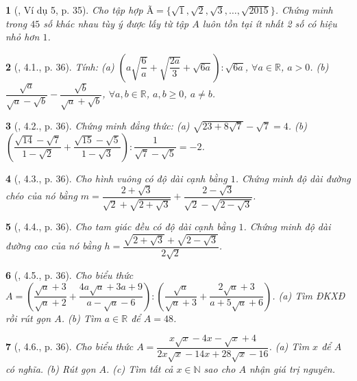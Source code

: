 \documentclass{article}
\newtheorem{baitoan}{}%
\begin{document}
\begin{baitoan}[\cite{Binh_boi_duong_Toan_9_tap_1}, Ví dụ 5, p. 35]
	Cho tập hợp $Ã = \{\sqrt{1},\sqrt{2},\sqrt{3},\ldots,\sqrt{2015}\}$. Chứng minh trong $45$ số khác nhau tùy ý được lấy từ tập $A$ luôn tồn tại ít nhất 2 số có hiệu nhỏ hơn $1$.
\end{baitoan}

\begin{baitoan}[\cite{Binh_boi_duong_Toan_9_tap_1}, 4.1., p. 36]
	Tính: (a) $\left(a\sqrt{\dfrac{6}{a}} + \sqrt{\dfrac{2a}{3}} + \sqrt{6a}\right):\sqrt{6a}$, $\forall a\in\mathbb{R}$, $a > 0$. (b) $\dfrac{\sqrt{a}}{\sqrt{a} - \sqrt{b}} - \dfrac{\sqrt{b}}{\sqrt{a} + \sqrt{b}}$, $\forall a,b\in\mathbb{R}$, $a,b\ge0$, $a\ne b$.
\end{baitoan}

\begin{baitoan}[\cite{Binh_boi_duong_Toan_9_tap_1}, 4.2., p. 36]
	Chứng minh đẳng thức: (a) $\sqrt{23 + 8\sqrt{7}} - \sqrt{7} = 4$. (b) $\left(\dfrac{\sqrt{14} - \sqrt{7}}{1 - \sqrt{2}} + \dfrac{\sqrt{15} - \sqrt{5}}{1 - \sqrt{3}}\right):\dfrac{1}{\sqrt{7} - \sqrt{5}} = -2$.
\end{baitoan}

\begin{baitoan}[\cite{Binh_boi_duong_Toan_9_tap_1}, 4.3., p. 36]
	Cho hình vuông có độ dài cạnh bằng $1$. Chứng minh độ dài đường chéo của nó bằng $m = \dfrac{2 + \sqrt{3}}{\sqrt{2} + \sqrt{2 + \sqrt{3}}} + \dfrac{2 - \sqrt{3}}{\sqrt{2} - \sqrt{2 - \sqrt{3}}}$.
\end{baitoan}

\begin{baitoan}[\cite{Binh_boi_duong_Toan_9_tap_1}, 4.4., p. 36]
	Cho tam giác đều có độ dài cạnh bằng $1$. Chứng minh độ dài đường cao của nó bằng $h = \dfrac{\sqrt{2 + \sqrt{3}} + \sqrt{2 - \sqrt{3}}}{2\sqrt{2}}$.
\end{baitoan}

\begin{baitoan}[\cite{Binh_boi_duong_Toan_9_tap_1}, 4.5., p. 36]
	Cho biểu thức $A = \left(\dfrac{\sqrt{a} + 3}{\sqrt{a} + 2} + \dfrac{4a\sqrt{a} + 3a + 9}{a - \sqrt{a} - 6}\right):\left(\dfrac{\sqrt{a}}{\sqrt{a} + 3} + \dfrac{2\sqrt{a} + 3}{a + 5\sqrt{a} + 6}\right)$. (a) Tìm {\rm ĐKXĐ} rồi rút gọn $A$. (b) Tìm $a\in\mathbb{R}$ để $A = 48$.
\end{baitoan}

\begin{baitoan}[\cite{Binh_boi_duong_Toan_9_tap_1}, 4.6., p. 36]
	Cho biểu thức $A = \dfrac{x\sqrt{x} - 4x - \sqrt{x} + 4}{2x\sqrt{x} - 14x + 28\sqrt{x} - 16}$. (a) Tìm $x$ để $A$ có nghĩa. (b) Rút gọn $A$. (c) Tìm tất cả $x\in\mathbb{N}$ sao cho $A$ nhận giá trị nguyên.
\end{baitoan}
\end{document}
